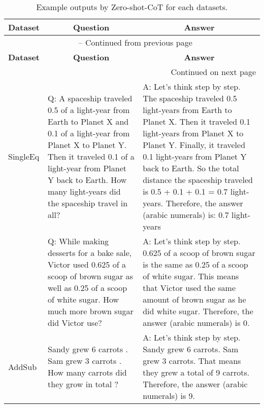 \documentclass{article}
\newcommand{\ours}{Zero-shot-CoT\xspace}
\newcommand{\okmark}{{\textbf{\textcolor[rgb]{0.1, 0.5, 0.1}{}}}}
\newcommand{\ngmark}{{\textbf{\color{red}{\ding{55}}}}}
\newcommand{\bblue}[1]{{\textbf{\color{blue}{#1}}}}
\newcommand{\myspace}{}
\begin{document}
\begin{center}
\begin{longtable}{|p{}|p{}|p{}|}
\caption{Example outputs by \ours for each datasets.}
\label{tab:example_table_dataset}\\

\toprule \multicolumn{1}{|c|}{\textbf{Dataset}} & \multicolumn{1}{c|}{\textbf{Question}} & \multicolumn{1}{c|}{\textbf{Answer}} \\ \midrule 
\endfirsthead

\multicolumn{3}{c}{{\tablename\ \thetable{} -- Continued from previous page}} \\
\toprule \multicolumn{1}{|c|}{\textbf{Dataset}} & \multicolumn{1}{c|}{\textbf{Question}} & \multicolumn{1}{c|}{\textbf{Answer}} \\ \midrule 
\endhead

\hline \multicolumn{3}{|r|}{{Continued on next page}} \\ \bottomrule
\endfoot

\bottomrule
\endlastfoot

SingleEq &Q: A spaceship traveled 0.5 of a light-year from Earth to Planet X and 0.1 of a light-year from Planet X to Planet Y. Then it traveled 0.1 of a light-year from Planet Y back to Earth. How many light-years did the spaceship travel in all? &A: Let's think step by step. The spaceship traveled 0.5 light-years from Earth to Planet X. Then it traveled 0.1 light-years from Planet X to Planet Y. Finally, it traveled 0.1 light-years from Planet Y back to Earth. So the total distance the spaceship traveled is 0.5 + 0.1 + 0.1 = 0.7 light-years. Therefore, the answer (arabic numerals) is: 0.7 light-years \okmark \\

\cmidrule(r){2-3}

&Q: While making desserts for a bake sale, Victor used 0.625 of a scoop of brown sugar as well as 0.25 of a scoop of white sugar. How much more brown sugar did Victor use? &A: Let's think step by step. 0.625 of a scoop of brown sugar is the same as 0.25 of a scoop of white sugar. This means that Victor used the same amount of brown sugar as he did white sugar. Therefore, the answer (arabic numerals) is 0. \ngmark \myspace \bblue{(GT : 0.375)}\\

\midrule

AddSub &Sandy grew 6 carrots . Sam grew 3 carrots . How many carrots did they grow in total ? &A: Let's think step by step. Sandy grew 6 carrots. Sam grew 3 carrots. That means they grew a total of 9 carrots. Therefore, the answer (arabic numerals) is 9. \okmark \\


\end{longtable}
\end{center}
\end{document}
